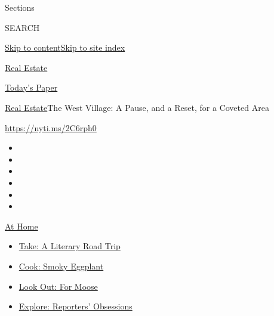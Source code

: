 Sections

SEARCH

\protect\hyperlink{site-content}{Skip to
content}\protect\hyperlink{site-index}{Skip to site index}

\href{https://www.nytimes3xbfgragh.onion/section/realestate}{Real
Estate}

\href{https://myaccount.nytimes3xbfgragh.onion/auth/login?response_type=cookie\&client_id=vi}{}

\href{https://www.nytimes3xbfgragh.onion/section/todayspaper}{Today's
Paper}

\href{/section/realestate}{Real Estate}\textbar{}The West Village: A
Pause, and a Reset, for a Coveted Area

\url{https://nyti.ms/2C6rph0}

\begin{itemize}
\item
\item
\item
\item
\item
\item
\end{itemize}

\href{https://www.nytimes3xbfgragh.onion/spotlight/at-home?action=click\&pgtype=Article\&state=default\&region=TOP_BANNER\&context=at_home_menu}{At
Home}

\begin{itemize}
\tightlist
\item
  \href{https://www.nytimes3xbfgragh.onion/2020/07/28/books/time-for-a-literary-road-trip.html?action=click\&pgtype=Article\&state=default\&region=TOP_BANNER\&context=at_home_menu}{Take:
  A Literary Road Trip}
\item
  \href{https://www.nytimes3xbfgragh.onion/2020/07/29/magazine/bored-with-your-home-cooking-some-smoky-eggplant-will-fix-that.html?action=click\&pgtype=Article\&state=default\&region=TOP_BANNER\&context=at_home_menu}{Cook:
  Smoky Eggplant}
\item
  \href{https://www.nytimes3xbfgragh.onion/2020/07/27/travel/moose-michigan-isle-royale.html?action=click\&pgtype=Article\&state=default\&region=TOP_BANNER\&context=at_home_menu}{Look
  Out: For Moose}
\item
  \href{https://www.nytimes3xbfgragh.onion/interactive/2020/at-home/even-more-reporters-editors-diaries-lists-recommendations.html?action=click\&pgtype=Article\&state=default\&region=TOP_BANNER\&context=at_home_menu}{Explore:
  Reporters' Obsessions}
\end{itemize}

